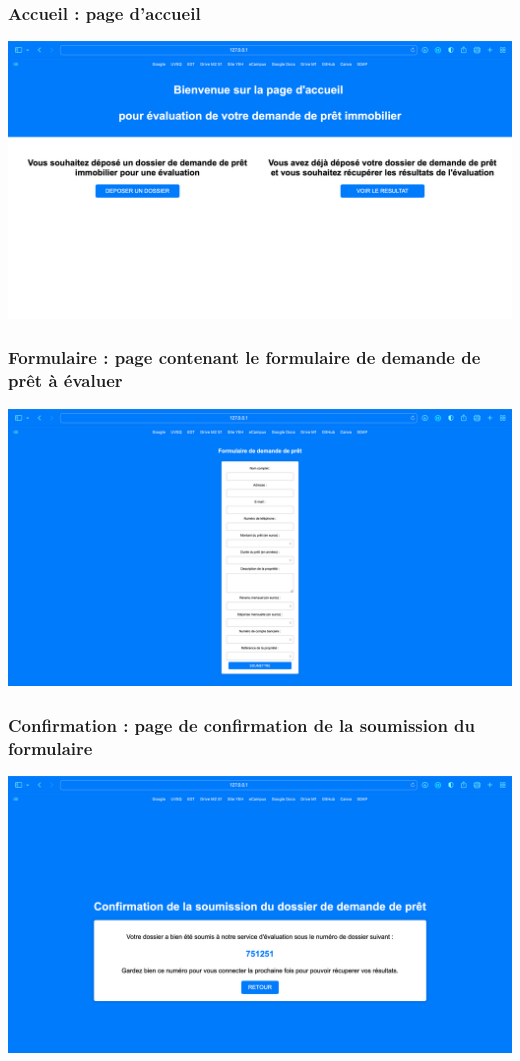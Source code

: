 \documentclass{article}
\begin{document}
    \subsubsection{Accueil : page d'accueil}
    \includegraphics[width=\textwidth]{Images/8.1/accueil.png}
    
    \subsubsection{Formulaire : page contenant le formulaire de demande de prêt à évaluer}
    \includegraphics[width=\textwidth]{Images/8.1/formulaire.png}
    
    \subsubsection{Confirmation : page de confirmation de la soumission du formulaire}
    \includegraphics[width=\textwidth]{Images/8.1/confirmation.png}
    
\end{document}
